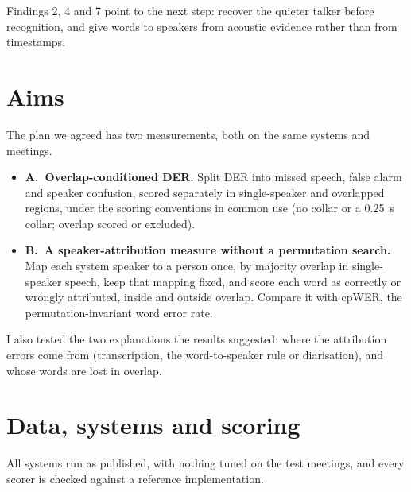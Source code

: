 \documentclass[11pt,a4paper]{article}
\begin{document}
Findings 2, 4 and 7 point to the next step: recover the quieter talker before recognition, and give words to speakers from acoustic evidence rather than from timestamps.

\section{Aims}

The plan we agreed has two measurements, both on the same systems and meetings.

\begin{itemize}[leftmargin=*]
  \item \textbf{A.\ Overlap-conditioned DER.} Split DER into missed speech, false alarm and speaker confusion, scored separately in single-speaker and overlapped regions, under the scoring conventions in common use (no collar or a 0.25~s collar; overlap scored or excluded).
  \item \textbf{B.\ A speaker-attribution measure without a permutation search.} Map each system speaker to a person once, by majority overlap in single-speaker speech, keep that mapping fixed, and score each word as correctly or wrongly attributed, inside and outside overlap. Compare it with cpWER, the permutation-invariant word error rate.
\end{itemize}

I also tested the two explanations the results suggested: where the attribution errors come from (transcription, the word-to-speaker rule or diarisation), and whose words are lost in overlap.

\section{Data, systems and scoring}

All systems run as published, with nothing tuned on the test meetings, and every scorer is checked against a reference implementation.
\end{document}
